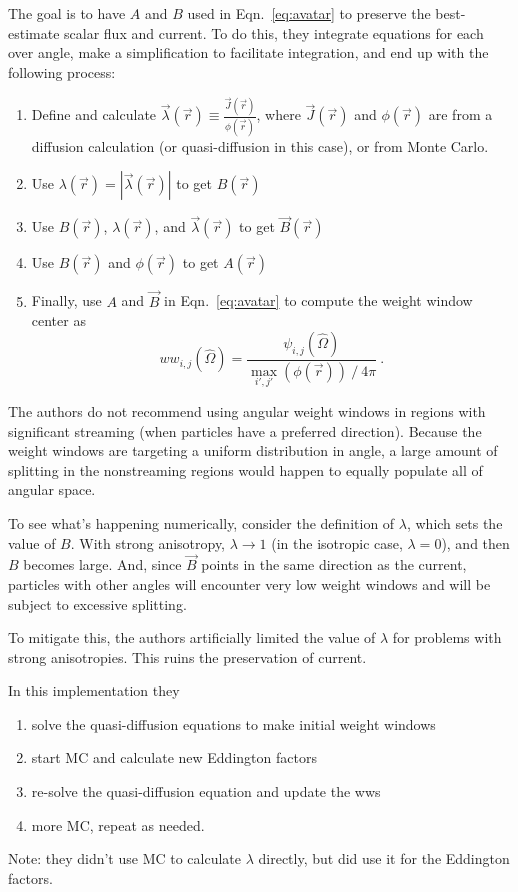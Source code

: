 \documentclass[12pt,twoside]{article}
\newcommand{\vOmega}{\ensuremath{\hat{\Omega}}}
\begin{document}
The goal is to have $A$ and $B$ used in Eqn.~\eqref{eq:avatar} to preserve the best-estimate scalar flux and current. To do this, they integrate equations for each over angle, make a simplification to facilitate integration, and end up with the following process:
\begin{enumerate}
  \item Define and calculate $\vec{\lambda}(\vec{r}) \equiv \frac{\vec{J}(\vec{r})}{\phi(\vec{r})}$, where $\vec{J}(\vec{r})$ and $\phi(\vec{r})$ are from a diffusion calculation (or quasi-diffusion in this case), or from Monte Carlo. 
  \item Use $\lambda(\vec{r}) = |\vec{\lambda}(\vec{r})|$ to get $B(\vec{r})$
  \item Use $B(\vec{r})$, $\lambda(\vec{r})$, and $\vec{\lambda}(\vec{r})$ to get $\vec{B}(\vec{r})$
  \item Use $B(\vec{r})$ and $\phi(\vec{r})$ to get $A(\vec{r})$
  \item Finally, use $A$ and $\vec{B}$ in Eqn.~\eqref{eq:avatar} to compute the weight window center as
  \begin{equation}
    ww_{i,j}(\vOmega) = \frac{\psi_{i,j}(\vOmega)}{\max_{i',j'}(\phi(\vec{r})) \:/\: 4 \pi} \:.
  \end{equation}
\end{enumerate}

The authors do not recommend using angular weight windows in regions with significant streaming (when particles have a preferred direction). Because the weight windows are targeting a uniform distribution in angle, a large amount of splitting in the nonstreaming regions would happen to equally populate all of angular space. 

To see what's happening numerically, consider the definition of $\lambda$, which sets the value of $B$. With strong anisotropy, $\lambda \rightarrow 1$ (in the isotropic case, $\lambda=0$), and then $B$ becomes large. And, since $\vec{B}$ points in the same direction as the current, particles with other angles will encounter very low weight windows and will be subject to excessive splitting. 

To mitigate this, the authors artificially limited the value of $\lambda$ for problems with strong anisotropies. This ruins the preservation of current.  

In this implementation they
\begin{enumerate}
  \item solve the quasi-diffusion equations to make initial weight windows
  \item start MC and calculate new Eddington factors
  \item re-solve the quasi-diffusion  equation and update the wws
  \item more MC, repeat as needed.
\end{enumerate}
Note: they didn't use MC to calculate $\lambda$ directly, but did use it for the Eddington factors. 
\end{document}
